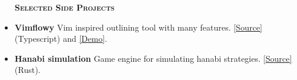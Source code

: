 \documentclass[11 pt]{article}
\begin{document}
\begin{itemize}





\begin{center}\begin{large}\textsc{\textbf{Selected Side Projects}\\}\end{large}\end{center}
 \setlength\itemsep{0em}
\item \textbf{Vimflowy}
Vim inspired outlining tool with many features. \href{https://github.com/WuTheFWasThat/vimflowy}{[Source]} (Typescript) and \href{https://vimflowy.netlify.com}{[Demo]}.
\item \textbf{Hanabi simulation}
Game engine for simulating hanabi strategies.  \href{https://github.com/WuTheFWasThat/hanabi.rs}{[Source]} (Rust).

\end{itemize}
\end{document}

